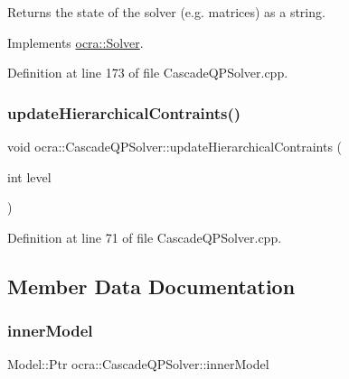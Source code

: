 Returns the state of the solver (e.\+g. matrices) as a string. 

Implements \hyperlink{classocra_1_1Solver_ab3783d1c208500bfb1daa3e1abf34146}{ocra\+::\+Solver}.



Definition at line 173 of file Cascade\+Q\+P\+Solver.\+cpp.

\hypertarget{classocra_1_1CascadeQPSolver_afeca9e40c6424236d4527d4c1b97fe51}{}\label{classocra_1_1CascadeQPSolver_afeca9e40c6424236d4527d4c1b97fe51} 
\subsubsection{\texorpdfstring{update\+Hierarchical\+Contraints()}{updateHierarchicalContraints()}}
{\footnotesize\ttfamily void ocra\+::\+Cascade\+Q\+P\+Solver\+::update\+Hierarchical\+Contraints (\begin{DoxyParamCaption}\item[{int}]{level }\end{DoxyParamCaption})}



Definition at line 71 of file Cascade\+Q\+P\+Solver.\+cpp.



\subsection{Member Data Documentation}
\hypertarget{classocra_1_1CascadeQPSolver_a3a7c69b86a236e8b0ffc678be798109f}{}\label{classocra_1_1CascadeQPSolver_a3a7c69b86a236e8b0ffc678be798109f} 
\subsubsection{\texorpdfstring{inner\+Model}{innerModel}}
{\footnotesize\ttfamily Model\+::\+Ptr ocra\+::\+Cascade\+Q\+P\+Solver\+::inner\+Model\hspace{0.3cm}{\ttfamily [protected]}}



